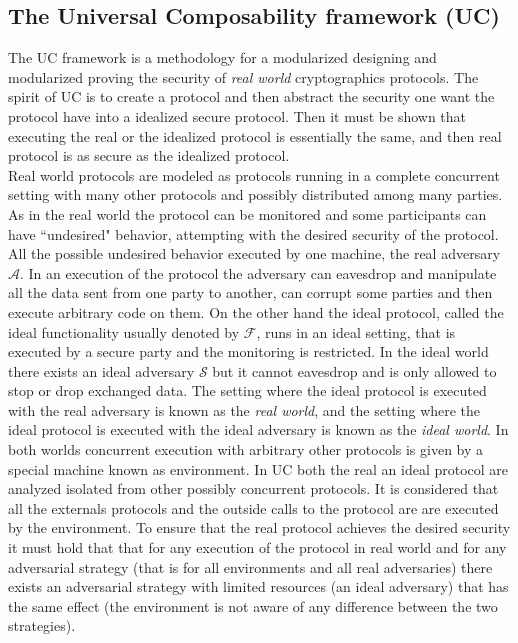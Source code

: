 \documentclass{acm_proc_article-sp}
\begin{document}
\subsection{The Universal Composability framework (UC)}
The UC framework is a methodology for a modularized designing and modularized proving the security of
\textit{real world} cryptographics protocols. The spirit of UC is to create a protocol and then abstract the
security one  want the protocol have into a idealized secure protocol. Then it must be shown that
executing the real or the idealized protocol is essentially the same, and then real protocol is as
secure as the idealized protocol.\\
Real world protocols are modeled as protocols running in a complete concurrent setting with many other protocols and
possibly distributed among many parties. As in the real world the protocol can be monitored and some participants
can have ``undesired" behavior, attempting with the desired security of the protocol. All the possible undesired behavior
executed by one machine, the real adversary $\mathcal{A}$. In an execution of the protocol the adversary can eavesdrop and
manipulate all the data sent from one  party to another, can corrupt some parties and then execute
arbitrary code on them. On the other hand the ideal protocol, called the ideal functionality usually denoted by
$\mathcal{F}$, runs in an ideal setting,
that is executed by a secure party and the monitoring is restricted. In the ideal world there exists an ideal adversary
$\mathcal{S}$ but it cannot
eavesdrop and is only allowed to stop or drop exchanged data. The setting where the ideal protocol is executed with the
real adversary is known as the \textit{real world}, and the setting where the ideal protocol is executed with the ideal
adversary is known as the \textit{ideal world}. In both worlds concurrent execution with arbitrary other protocols is
given by a special machine known as environment. In UC both the real an ideal protocol are analyzed isolated from other
possibly concurrent protocols. It is considered that all the externals protocols and the outside calls to the protocol
are are executed by the environment.
To ensure that the real protocol achieves
the desired security it must hold that that for any execution of the protocol in real world and for any adversarial
strategy (that is for all environments and all real adversaries) there exists an adversarial strategy with limited
resources (an ideal adversary) that has the same effect (the environment is not aware of any difference between the
two strategies).\\
\end{document}
